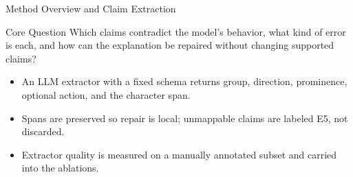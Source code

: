 \documentclass[aspectratio=169,10pt]{beamer}
\begin{document}
\begin{frame}{Method Overview and Claim Extraction}
  \begin{block}{Core Question}
    Which claims contradict the model's behavior, what kind of error is each, and how can the explanation be repaired without changing supported claims?
  \end{block}
  \vspace{1.2ex}
  \begin{center}
  \end{center}
  \begin{itemize}\small
    \setlength{\itemsep}{0.8ex}
    \item[\textbullet] An LLM extractor with a fixed schema returns group, direction, prominence, optional action, and the character span.
    \item[\textbullet] Spans are preserved so repair is local; unmappable claims are labeled E5, not discarded.
    \item[\textbullet] Extractor quality is measured on a manually annotated subset and carried into the ablations.
  \end{itemize}
\end{frame}
\end{document}
